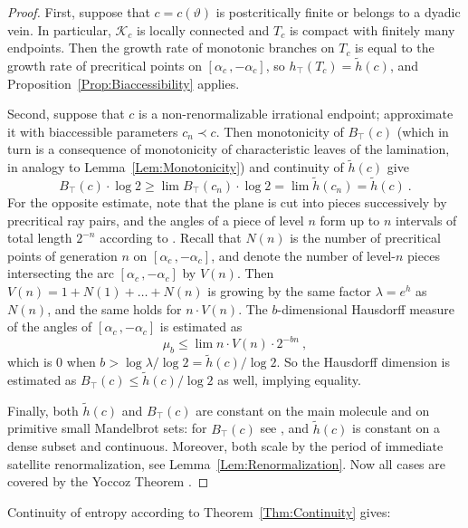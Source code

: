 \documentclass[12pt]{amsart}
\newcommand{\0}{\texttt{0}}
\newcommand{\1}{\texttt{1}}
\theoremstyle{definition}
\numberwithin{equation}{section}
\renewcommand{\theta}{\vartheta}
\begin{document}
\begin{proof} First, suppose that $c=c(\theta)$ is postcritically finite or
belongs to a dyadic vein. In particular, $\mathcal{K}_c$ is
locally connected and $T_c$ is compact with finitely many endpoints. Then
the growth rate of monotonic branches on $T_c$ is equal to the growth rate of
precritical points on $[\alpha_c\,,-\alpha_c]$, so $h_\top(T_c)=\tilde h(c)$,
and Proposition~\ref{Prop:Biaccessibility} applies.

Second, suppose that $c$ is a non-renormalizable irrational endpoint; 
approximate it with biaccessible parameters $c_n\prec c$. Then monotonicity of
$B_\top(c)$ \cite[Proposition~4.6]{Jung} 
(which in turn is a consequence of monotonicity of characteristic leaves of the lamination, in analogy to Lemma~\ref{Lem:Monotonicity}) and continuity of $\tilde h(c)$ give
\begin{equation}
B_\top(c)\cdot\log2\ge\lim B_\top(c_n)\cdot\log2
=\lim\tilde h(c_n)=\tilde h(c) \ .
\end{equation}
For the opposite estimate, note that the plane is cut into pieces successively
by precritical ray pairs, and the angles of a piece of level $n$ form up to $n$
intervals of total length $2^{-n}$ according to
\cite[Lemma~4.1]{BruinSchleicher}. Recall that $N(n)$ is the number of
precritical points of generation $n$ on $[\alpha_c\,,-\alpha_c]$, and denote
the number of level-$n$ pieces intersecting the arc $[\alpha_c\,,-\alpha_c]$
by $V(n)$. Then $V(n)=1+N(1)+\dots+N(n)$ is growing by the same factor
$\lambda=e^h$ as $N(n)$, and the same holds for $n \cdot V(n)$. The
$b$-dimensional Hausdorff measure of the angles of $[\alpha_c\,,-\alpha_c]$ is
estimated as
\begin{equation}
\mu_b\le\lim n \cdot V(n) \cdot 2^{-bn} \ ,
\end{equation}
which is 0 when $b>\log\lambda/\log2=\tilde h(c)/\log2$. So the Hausdorff
dimension is estimated as $B_\top(c)\le\tilde h(c)/\log2$ as well,
implying equality.

Finally, both $\tilde h(c)$ and $B_\top(c)$ are constant on the main molecule
and on primitive small Mandelbrot sets: for $B_\top(c)$ see
\cite[Theorem~4.7]{Jung}, and $\tilde h(c)$ is constant on a dense subset and
continuous. Moreover, both scale by the period of
immediate satellite renormalization, see Lemma~\ref{Lem:Renormalization}.
Now all cases are covered by the Yoccoz Theorem \cite{MiRenorm}. 
\end{proof}

Continuity of entropy according to Theorem~\ref{Thm:Continuity} gives:
\end{document}

